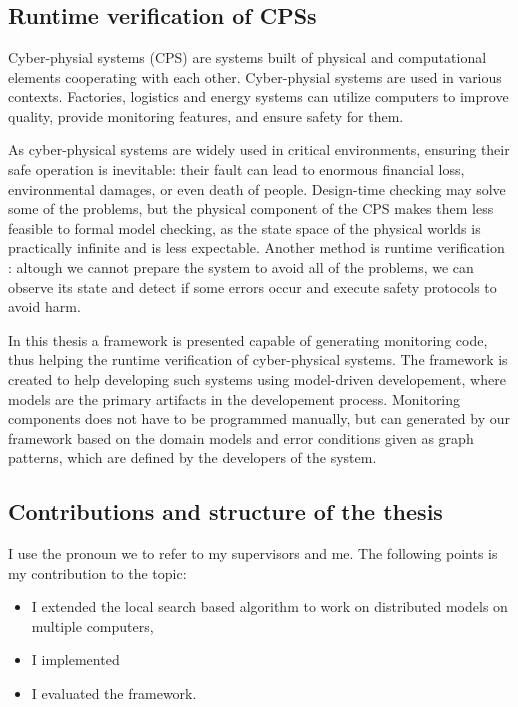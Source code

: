 \chapter{\bevezetes}

\section{Runtime verification of CPSs}
Cyber-physial systems (CPS) are systems built of physical and computational elements cooperating with each other.
Cyber-physial systems are used in various contexts. 
Factories, logistics and energy systems can utilize computers to improve quality, provide monitoring features, and ensure safety for them.

As cyber-physical systems are widely used in critical environments, ensuring their safe operation is inevitable: their fault can lead to enormous financial loss, environmental damages, or even death of people.
Design-time checking may solve some of the problems, but the physical component of the CPS makes them less feasible to formal model checking, as the state space of the physical worlds is practically infinite and is less expectable.
Another method is runtime verification \cite{fasecikk}: altough we cannot prepare the system to avoid all of the problems, we can observe its state and detect if some errors occur and execute safety protocols to avoid harm. 


In this thesis a framework is presented capable of generating monitoring code, thus helping the runtime verification of cyber-physical systems. 
The framework is created to help developing such systems using model-driven developement, where models are the primary artifacts in the developement process.
Monitoring components does not have to be programmed manually, but can generated by our framework based on the domain models and error conditions given as graph patterns, which are defined by the developers of the system.

\section{Contributions and structure of the thesis}

I use the pronoun we to refer to my supervisors and me. 
The following points is my contribution to the topic:
\begin{itemize}
	\item I extended the local search based algorithm to work on distributed models on multiple computers,
	\item I implemented 
	\item I evaluated the framework.
\end{itemize}
	
